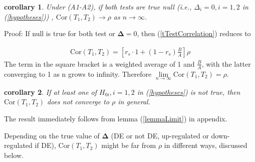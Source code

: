 \documentclass[12pt, a4paper]{article}
\newtheorem{corollary}{corollary}
\begin{document}
	\begin{corollary} 
		Under (A1-A2), if both tests are true null (i.e., $\Delta_i = 0, i=1, 2$ in (\ref{hypotheses})) ,
		$\text{Cor}({T_1, T_2})\rightarrow \rho$ as $n \rightarrow \infty$. 
	\end{corollary}
	Proof:  If null is true for both test or $\bm \Delta  = 0$, then (\ref{tTestCorrelation}) reduces to
	
	\begin{align}\label{CalculateTCor}
		\text{Cor}(T_1, T_2) = \left[r_s \cdot 1 + (1-r_s)\frac{B}{A}\right]\rho
	\end{align}
	The term in the square bracket is a weighted average of 1 and $\frac{B}{A}$, with the latter
	converging to 1 as n grows to infinity. Therefore $\lim\limits_{n\rightarrow\infty} \text{Cor}({T_1,
		T_2}) = \rho$.
	\begin{corollary} 
		If at least one of $H_{0i}, i = 1, 2$ in (\ref{hypotheses}) is not true, then  $\text{Cor}({T_1,
			T_2})$ does not converge to $\rho$ in general.
	\end{corollary} 
	The result immediately follows from lemma  (\ref{lemmaLimit}) in appendix.
	
	Depending on the true value of $\bm\Delta$ (DE or not DE, up-regulated or down-regulated if DE),
	$\text{Cor}({T_1, T_2})$ might be far from $\rho$ in different ways, discussed below.
	
\end{document}
